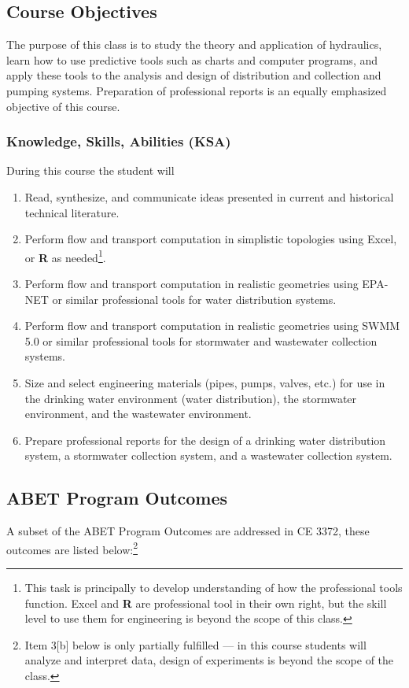 \documentclass[12pt]{article}
\begin{document}
\subsection*{{Course Objectives}}
The purpose of this class is to study the theory and application of hydraulics, learn how to use predictive tools such as charts and computer programs, and apply these tools to the analysis and design of distribution and collection and pumping systems.  Preparation of professional reports is an equally emphasized objective of this course.
\subsubsection*{{Knowledge, Skills, Abilities (KSA)}}
During this course the student will
\begin{enumerate}
\item Read, synthesize, and communicate ideas presented in current and historical technical literature.
\item Perform flow and transport computation in simplistic topologies using Excel, or \textbf{R} as needed\footnote{This task is principally to develop understanding of how the professional tools function.  Excel and \textbf{R} are professional tool in their own right, but the skill level to use them for engineering is beyond the scope of this class.}.
\item Perform flow and transport computation in realistic geometries using EPA-NET or similar professional tools for water distribution systems.
\item Perform flow and transport computation in realistic geometries using SWMM 5.0 or similar professional tools for stormwater and wastewater collection systems.
\item Size and select engineering materials (pipes, pumps, valves, etc.) for use in the drinking water environment (water distribution), the stormwater environment, and the wastewater environment.
\item Prepare professional reports for the design of a drinking water distribution system, a stormwater collection system, and a wastewater collection system.  

\end{enumerate}

\subsection*{ABET Program Outcomes}
A subset of the ABET Program Outcomes are addressed in CE 3372, these outcomes are listed below:\footnote{Item 3[b] below is only partially fulfilled --- in this course students will analyze and interpret data, design of experiments is beyond the scope of the class.}
\end{document}
